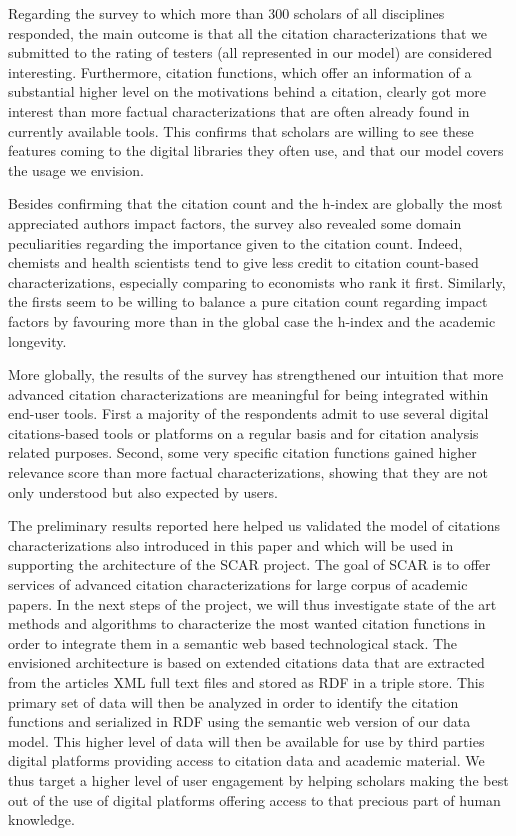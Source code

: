 \documentclass[runningheads,a4paper]{llncs}
\begin{document}
Regarding the survey to which more than 300 scholars of all disciplines responded, the main outcome is that all the citation characterizations that we submitted to the rating of testers (all represented in our model) are considered interesting. Furthermore, citation functions, which offer an information of a substantial higher level on the motivations behind a citation, clearly got more interest than more factual characterizations that are often already found in currently available tools. This confirms that scholars are willing to see these features coming to the digital libraries they often use, and that our model covers the usage we envision.

Besides confirming that the citation count and the h-index are globally the most appreciated authors impact factors, the survey also revealed some domain peculiarities regarding the importance given to the citation count. Indeed, chemists and health scientists tend to give less credit to citation count-based characterizations, especially comparing to economists who rank it first. Similarly, the firsts seem to be willing to balance a pure citation count regarding impact factors by favouring more than in the global case the h-index and the academic longevity.

More globally, the results of the survey has strengthened our intuition that more advanced citation characterizations are meaningful for being integrated within end-user tools. First a majority of the respondents admit to use several digital citations-based tools or platforms on a regular basis and for citation analysis related purposes. Second, some very specific citation functions gained higher relevance score than more factual characterizations, showing that they are not only understood but also expected by users.

The preliminary results reported here helped us validated the model of citations characterizations also introduced in this paper and which will be used in supporting the architecture of the SCAR project. The goal of SCAR is to offer services of advanced citation characterizations for large corpus of academic papers. In the next steps of the project, we will thus investigate state of the art methods and algorithms to characterize the most wanted citation functions in order to integrate them in a semantic web based technological stack. The envisioned architecture is based on extended citations data that are extracted from the articles XML full text files and stored as RDF in a triple store. This primary set of data will then be analyzed in order to identify the citation functions and serialized in RDF using the semantic web version of our data model. This higher level of data will then be available for use by third parties digital platforms providing access to citation data and academic material. We thus target a higher level of user engagement by helping scholars making the best out of the use of digital platforms offering access to that precious part of human knowledge.
\end{document}
